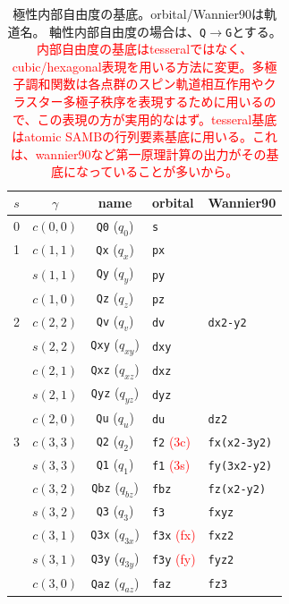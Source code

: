 \documentclass[11pt]{easymemo}
\begin{document}
\begin{table}[t!]
\caption{極性内部自由度の基底。orbital/Wannier90は軌道名。
軸性内部自由度の場合は、{\tt Q}$\to${\tt G}とする。
\textcolor{red}{内部自由度の基底はtesseralではなく、cubic/hexagonal表現を用いる方法に変更。多極子調和関数は各点群のスピン軌道相互作用やクラスター多極子秩序を表現するために用いるので、この表現の方が実用的なはず。tesseral基底はatomic SAMBの行列要素基底に用いる。これは、wannier90など第一原理計算の出力がその基底になっていることが多いから。}
\label{tbl:tesbasis}}
\begin{center}
\begin{tabular}{cccll} \hline\hline
$s$ & $\gamma$ & name & orbital & Wannier90 \\ \hline
0 & $c(0,0)$ & {\tt Q0} ($q_{0}$) & {\tt s} \\ \hline
1 & $c(1,1)$ & {\tt Qx} ($q_{x}$) & {\tt px} \\
  & $s(1,1)$ & {\tt Qy} ($q_{y}$) & {\tt py} \\
  & $c(1,0)$ & {\tt Qz} ($q_{z}$) & {\tt pz} \\
\hline
2 & $c(2,2)$ & {\tt Qv} ($q_{v}$) & {\tt dv} & {\tt dx2-y2} \\
  & $s(2,2)$ & {\tt Qxy} ($q_{xy}$) & {\tt dxy} \\
  & $c(2,1)$ & {\tt Qxz} ($q_{xz}$) & {\tt dxz} \\
  & $s(2,1)$ & {\tt Qyz} ($q_{yz}$) & {\tt dyz} \\
  & $c(2,0)$ & {\tt Qu} ($q_{u}$) &  {\tt du} & {\tt dz2} \\
\hline
3 & $c(3,3)$ & {\tt Q2} ($q_{2}$) & {\tt f2} \textcolor{red}{(3c)} & {\tt fx(x2-3y2)} \\
  & $s(3,3)$ & {\tt Q1} ($q_{1}$) & {\tt f1} \textcolor{red}{(3s)} & {\tt fy(3x2-y2)} \\
  & $c(3,2)$ & {\tt Qbz} ($q_{bz}$) & {\tt fbz} & {\tt fz(x2-y2)} \\
  & $s(3,2)$ & {\tt Q3} ($q_{3}$) & {\tt f3} & {\tt fxyz} \\
  & $c(3,1)$ & {\tt Q3x} ($q_{3x}$) & {\tt f3x} \textcolor{red}{(fx)} & {\tt fxz2} \\
  & $s(3,1)$ & {\tt Q3y} ($q_{3y}$) & {\tt f3y} \textcolor{red}{(fy)} & {\tt fyz2} \\
  & $c(3,0)$ & {\tt Qaz} ($q_{az}$) & {\tt faz} & {\tt fz3} \\
\hline\hline
\end{tabular}
\end{center}
\end{table}
\end{document}
